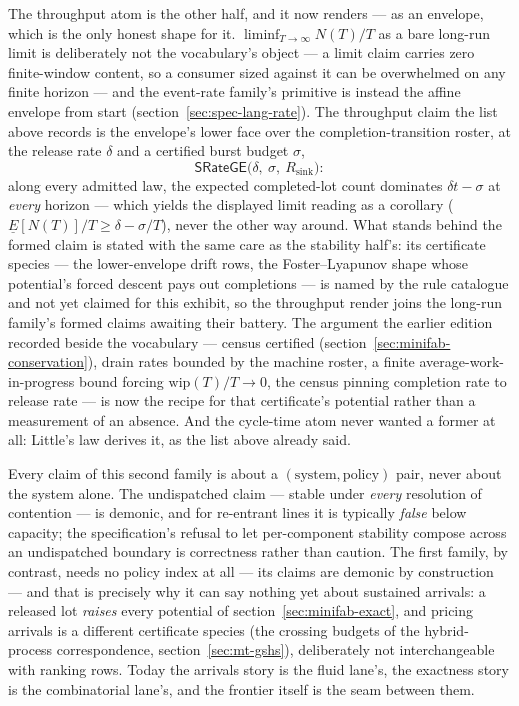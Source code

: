 The throughput atom is the other half, and it now renders --- as an
envelope, which is the only honest shape for it.
$\liminf_{T \to \infty} N(T)/T$ as a bare long-run limit is
deliberately not the vocabulary's object --- a limit claim carries
zero finite-window content, so a consumer sized against it can be
overwhelmed on any finite horizon --- and the event-rate family's
primitive is instead the affine envelope from start
(section~\ref{sec:spec-lang-rate}). The throughput claim the list
above records is the envelope's lower face over the
completion-transition roster, at the release rate $\delta$ and a
certified burst budget $\sigma$,
\[
  \mathsf{SRateGE}\bigl(\delta,\ \sigma,\ R_{\mathrm{sink}}\bigr):
\]
along every admitted law, the expected completed-lot count
dominates $\delta t - \sigma$ at \emph{every} horizon --- which
yields the displayed limit reading as a corollary
($\underline{E}[N(T)]/T \ge \delta - \sigma/T$), never the other
way around. What stands behind the formed claim is stated with the
same care as the stability half's: its certificate species --- the
lower-envelope drift rows, the Foster--Lyapunov shape whose
potential's forced descent pays out completions --- is named by
the rule catalogue and not yet claimed for this exhibit, so the
throughput render joins the long-run family's formed claims
awaiting their battery. The argument the earlier edition recorded
beside the vocabulary --- census certified
(section~\ref{sec:minifab-conservation}), drain rates bounded by
the machine roster, a finite average-work-in-progress bound
forcing $\mathrm{wip}(T)/T \to 0$, the census pinning completion
rate to release rate --- is now the recipe for that certificate's
potential rather than a measurement of an absence. And the
cycle-time atom never wanted a former at all: Little's law derives
it, as the list above already said.

Every claim of this second family is about a $(\text{system},
\text{policy})$ pair, never about the system alone. The undispatched
claim --- stable under \emph{every} resolution of contention --- is
demonic, and for re-entrant lines it is typically \emph{false} below
capacity; the specification's refusal to let per-component stability
compose across an undispatched boundary is correctness rather than
caution. The first family, by contrast, needs no policy index at all
--- its claims are demonic by construction --- and that is precisely
why it can say nothing yet about sustained arrivals: a released lot
\emph{raises} every potential of
section~\ref{sec:minifab-exact}, and pricing arrivals is a different
certificate species (the crossing budgets of the hybrid-process
correspondence, section~\ref{sec:mt-gshs}), deliberately not
interchangeable with ranking rows. Today the arrivals story is the
fluid lane's, the exactness story is the combinatorial lane's, and
the frontier itself is the seam between them.


